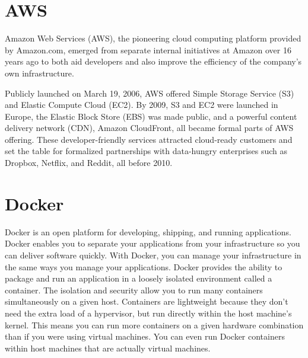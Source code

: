 \section {AWS}
Amazon Web Services (AWS), the pioneering cloud computing platform provided by Amazon.com, emerged from separate internal initiatives at Amazon over 16 years ago to both aid developers and also improve the efficiency of the company’s own infrastructure.\newline

Publicly launched on March 19, 2006, AWS offered Simple Storage Service (S3) and Elastic Compute Cloud (EC2). By 2009, S3 and EC2 were launched in Europe, the Elastic Block Store (EBS) was made public, and a powerful content delivery network (CDN), Amazon CloudFront, all became formal parts of AWS offering. These developer-friendly services attracted cloud-ready customers and set the table for formalized partnerships with data-hungry enterprises such as Dropbox, Netflix, and Reddit, all before 2010.\newline

\section {Docker}
Docker is an open platform for developing, shipping, and running applications. Docker enables you to separate your applications from your infrastructure so you can deliver software quickly. With Docker, you can manage your infrastructure in the same ways you manage your applications. Docker provides the ability to package and run an application in a loosely isolated environment called a container. The isolation and security allow you to run many containers simultaneously on a given host. Containers are lightweight because they don’t need the extra load of a hypervisor, but run directly within the host machine’s kernel. This means you can run more containers on a given hardware combination than if you were using virtual machines. You can even run Docker containers within host machines that are actually virtual machines.